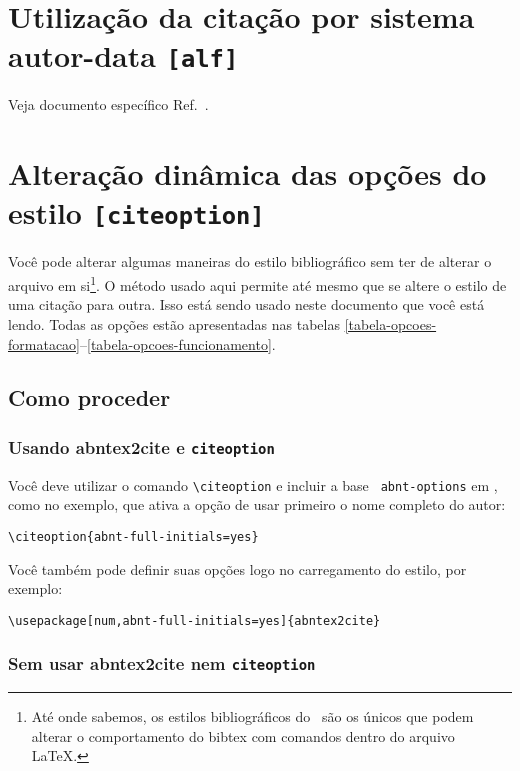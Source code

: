 \documentclass[a4paper]{ltxdoc}
\begin{document}
\section{Utilização da citação por sistema autor-data \texttt{[alf]}}

Veja documento específico Ref.~.

\section{Alteração dinâmica das opções do estilo \texttt{[citeoption]}}

\label{chapter-opcoes-estilo}

Você pode alterar algumas maneiras do estilo bibliográfico sem ter de alterar o
arquivo em si\footnote{Até onde sabemos, os estilos bibliográficos do \abnTeX\
são os únicos que podem alterar o comportamento do \textsf{bibtex} com comandos
dentro do arquivo \LaTeX.}. O método usado aqui permite até mesmo que se altere o estilo
de uma citação para outra. Isso está sendo usado neste documento que você está
lendo. Todas as opções estão apresentadas nas tabelas
\ref{tabela-opcoes-formatacao}--\ref{tabela-opcoes-funcionamento}.

\subsection{Como proceder}

\subsubsection{Usando \textsf{abntex2cite} e \texttt{citeoption}}

\DescribeMacro{\citeoption}
Você deve utilizar o comando \verb+\citeoption+ e incluir a base \texttt{
abnt-options} em \verb++, como no exemplo, que ativa a opção de
usar primeiro o nome completo do autor:

\begin{verbatim}
\citeoption{abnt-full-initials=yes}
\end{verbatim}

Você também pode definir suas opções logo no carregamento do estilo, por
exemplo:

\begin{verbatim}
\usepackage[num,abnt-full-initials=yes]{abntex2cite}
\end{verbatim}

\subsubsection{Sem usar \textsf{abntex2cite} nem \texttt{citeoption}}
\end{document}
